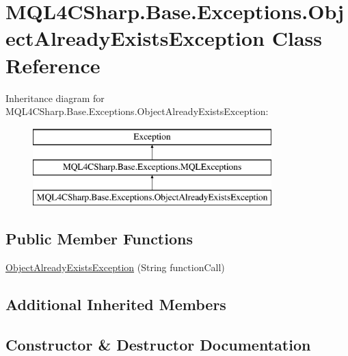 \hypertarget{class_m_q_l4_c_sharp_1_1_base_1_1_exceptions_1_1_object_already_exists_exception}{}\section{M\+Q\+L4\+C\+Sharp.\+Base.\+Exceptions.\+Object\+Already\+Exists\+Exception Class Reference}
\label{class_m_q_l4_c_sharp_1_1_base_1_1_exceptions_1_1_object_already_exists_exception}
Inheritance diagram for M\+Q\+L4\+C\+Sharp.\+Base.\+Exceptions.\+Object\+Already\+Exists\+Exception\+:\begin{figure}[H]
\begin{center}
\leavevmode
\includegraphics[height=3.000000cm]{class_m_q_l4_c_sharp_1_1_base_1_1_exceptions_1_1_object_already_exists_exception}
\end{center}
\end{figure}
\subsection*{Public Member Functions}
\begin{DoxyCompactItemize}
\item 
\hyperlink{class_m_q_l4_c_sharp_1_1_base_1_1_exceptions_1_1_object_already_exists_exception_aee762b94b0fbec50b4432eaa628d9a58}{Object\+Already\+Exists\+Exception} (String function\+Call)
\end{DoxyCompactItemize}
\subsection*{Additional Inherited Members}


\subsection{Constructor \& Destructor Documentation}
